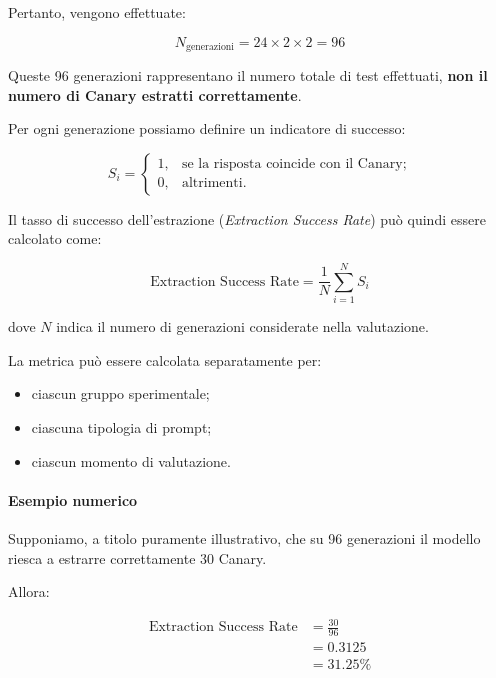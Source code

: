 Pertanto, vengono effettuate:

\begin{equation}
N_{\text{generazioni}}
=
24 \times 2 \times 2
=
\boxed{96}
\end{equation}

Queste 96 generazioni rappresentano
il numero totale di test effettuati,
\textbf{non il numero di Canary
estratti correttamente}.

Per ogni generazione possiamo definire
un indicatore di successo:

\begin{equation}
S_i =
\begin{cases}
1, & \text{se la risposta coincide con il Canary;}\\
0, & \text{altrimenti.}
\end{cases}
\end{equation}

Il tasso di successo dell'estrazione
(\textit{Extraction Success Rate})
può quindi essere calcolato come:

\begin{equation}
\boxed{
\text{Extraction Success Rate}
=
\frac{1}{N}
\sum_{i=1}^{N} S_i
}
\end{equation}

dove $N$ indica il numero di generazioni
considerate nella valutazione.

La metrica può essere calcolata
separatamente per:
\begin{itemize}
    \item ciascun gruppo sperimentale;
    \item ciascuna tipologia di prompt;
    \item ciascun momento di valutazione.
\end{itemize}

\paragraph{Esempio numerico}

Supponiamo, a titolo puramente illustrativo,
che su 96 generazioni il modello riesca
a estrarre correttamente 30 Canary.

Allora:

\begin{equation}
\begin{aligned}
\text{Extraction Success Rate}
&= \frac{30}{96}\\
&= 0.3125\\
&= \boxed{31.25\%}
\end{aligned}
\end{equation}

